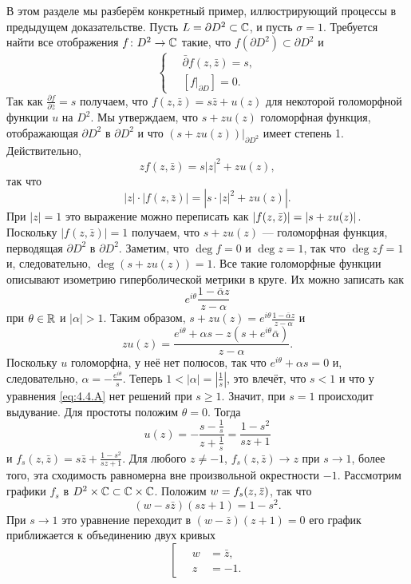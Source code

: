 В этом разделе мы разберём конкретный пример, иллюстрирующий процессы в предыдущем доказательстве.
Пусть $L = \partial D^2 \subset \mathbb{C}$, и пусть $\sigma = 1$.
Требуется найти все отображения $f\colon D^2 \to \mathbb{C}$ такие, что $f
(\partial D^2) \subset \partial D^2$ и 
\begin{equation}
\begin{cases}
\quad\bar\partial f(z,\bar z)=s,
\\
\quad[f|_{\partial D}]=0.
\end{cases}
\label{eq:4.4.A}
\end{equation}
Так как $\tfrac{\partial f}{\partial \bar z} = s$ получаем, что $f (z,
\bar z) = s\bar z + u (z)$ для некоторой голоморфной функции $u$ на
$D^2$. 
Мы утверждаем, что $s+ zu (z)$ голоморфная функция, отображающая
$\partial D^2$ в $\partial D^2$ и что $(s+ zu (z))|_{\partial D^2}$
имеет степень 1. 
Действительно, 
\[zf (z,\bar z) = s | z |^2 + zu (z),\]
так что
\[|z|\cdot| f (z, \bar z) | = \left| s \cdot\left| z \right|^{2} + zu (z)\right|.\]
При $|z|=1$ это выражение можно переписать как
$|f(z,\bar z)|=|s\z+zu(z)|$.
Поскольку $|f(z,\bar z)|=1$ получаем, что $s+zu(z)$ — голоморфная функция, перводящая $\partial D^2$ в $\partial D^2$.
Заметим, что $\deg f = 0$ и $\deg z = 1$, так что $\deg zf= 1 $ и, следовательно, $\deg (s + zu (z)) = 1$.
Все такие голоморфные функции описывают изометрию гиперболической метрики в круге.
Их можно записать как
\[e^{i\theta}\frac{1 - \bar\alpha z}{z-\alpha}\]
при $\theta \in \mathbb{R}$ и $| \alpha | > 1$.
Таким образом, $s + zu (z) = e^{i\theta}\frac{1 - \bar\alpha z}{z-\alpha}$ и 
\[zu (z)
=
\frac{e^{i\theta} + \alpha s - z (s + e^{i\theta} \bar\alpha)}{z-\alpha}.\]
Поскольку $u$ голоморфна, у неё нет полюсов, так что $e^{i\theta} +
\alpha s = 0$ и, следовательно, $\alpha =-\frac{e^{i\theta}}{s}$.
Теперь $1 <| \alpha | = | \tfrac1s |$, это влечёт, что $s<1$ и что у уравнения \ref{eq:4.4.A} нет решений при $s \ge 1$.
Значит, при $s = 1$ происходит выдувание.
Для простоты положим $\theta = 0$.
Тогда 
\[u(z)
=
-\frac{s-\frac1s}{z+\frac1s}
=
\frac{1-s^2}{sz+1}\]
и $f_s(z,\bar z)=s\bar z+\frac{1-s^2}{sz+1}$.
Для любого $z \ne -1$, $f_s (z, \bar z) \to z$ при $s\to1$, 
более того, эта сходимость равномерна вне произвольной окрестности $-1$.
Рассмотрим графики $f_s$ в $D^2 \times \mathbb{C} \subset \mathbb{C} \times
  \mathbb{C}$.
Положим $w \z= f_s (z, \bar z)$, так что 
\[(w - s\bar z) (sz + 1) = 1 - s^2.\]
При $s \to 1$ это уравнение переходит в $(w - \bar z) (z + 1) = 0$ его график приближается к объединению двух кривых 
\[
\left[
\begin{aligned}
\quad w&=\bar z,
\\
\quad z&=-1.
\end{aligned}
\right.
\]


